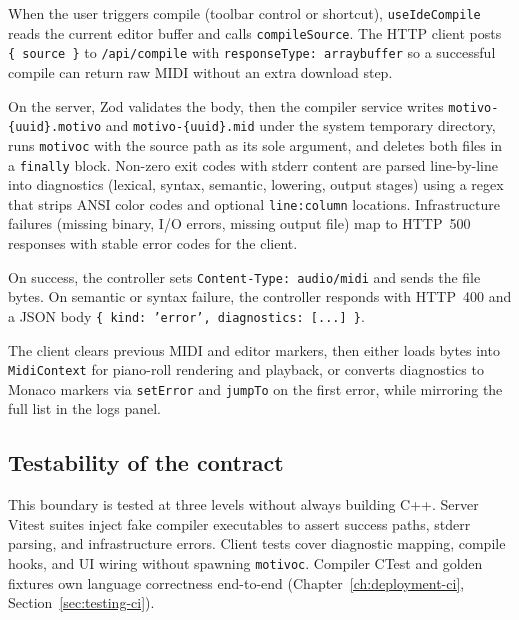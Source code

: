When the user triggers compile (toolbar control or shortcut), \texttt{useIdeCompile} reads the current editor buffer
and calls \texttt{compileSource}.
The HTTP client posts \texttt{\{ source \}} to \texttt{/api/compile} with \texttt{responseType: arraybuffer} so a
successful compile can return raw MIDI without an extra download step.

On the server, Zod validates the body, then the compiler service writes \texttt{motivo-\{uuid\}.motivo} and
\texttt{motivo-\{uuid\}.mid} under the system temporary directory, runs \texttt{motivoc} with the source path
as its sole
argument, and deletes both files in a \texttt{finally} block.
Non-zero exit codes with stderr content are parsed line-by-line into diagnostics (lexical, syntax, semantic, lowering,
output stages) using a regex that strips ANSI color codes and optional \texttt{line:column} locations.
Infrastructure failures (missing binary, I/O errors, missing output file) map to HTTP~500 responses with stable error
codes for the client.

On success, the controller sets \texttt{Content-Type: audio/midi} and sends the file bytes.
On semantic or syntax failure, the controller responds with HTTP~400 and a JSON body \texttt{\{ kind: 'error',
diagnostics: [...] \}}.

The client clears previous MIDI and editor markers, then either loads bytes into \texttt{MidiContext} for piano-roll
rendering and playback, or converts diagnostics to Monaco markers via \texttt{setError} and \texttt{jumpTo} on the first
error, while mirroring the full list in the logs panel.

\subsection{Testability of the contract}\label{subsec:compile-contract-tests}

This boundary is tested at three levels without always building C++.
Server Vitest suites inject fake compiler executables to assert success paths, stderr parsing, and infrastructure
errors.
Client tests cover diagnostic mapping, compile hooks, and UI wiring without spawning \texttt{motivoc}.
Compiler CTest and golden fixtures own language correctness end-to-end (Chapter~\ref{ch:deployment-ci},
Section~\ref{sec:testing-ci}).
